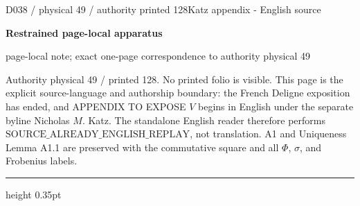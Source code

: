\documentclass[9pt]{article}
\newcommand{\CanonText}[1]{\par{\fontsize{8.0}{9.35}\selectfont\RaggedRight #1\par}\vspace{2.2pt}}
\newcommand{\LayerTitle}{Restrained page-local apparatus}
\begin{document}
\noindent\begin{minipage}[t][\dimexpr\textheight-5pt\relax][t]{\textwidth}
{\sffamily\fontsize{7.3}{8.2}\selectfont\color{Quiet} D038 / physical 49 / authority printed 128\hfill Katz appendix - English source}
\par{}\vspace{4.5pt}
{\sffamily\fontsize{10.4}{11.6}\selectfont\bfseries\color{Accent} \LayerTitle}
\par{\sffamily\fontsize{6.7}{7.7}\selectfont\color{Quiet} page-local note; exact one-page correspondence to authority physical 49}
\vspace{5pt}
\CanonText{Authority physical 49 / printed 128. No printed folio is visible. This page is the explicit source-language and authorship boundary: the French Deligne exposition has ended, and APPENDIX TO EXPOSE \(V\) begins in English under the separate byline Nicholas \(M\). Katz. The standalone English reader therefore performs \(\text{SOURCE\_ALREADY\_ENGLISH\_REPLAY}\), not translation. A1 and Uniqueness Lemma A1.1 are preserved with the commutative square and all \(\Phi{}\), \(\sigma{}\), and Frobenius labels.}
\vfill
{\color{Accent}\hrule height 0.35pt}\vspace{3pt}
\end{minipage}
\newpage
\end{document}
